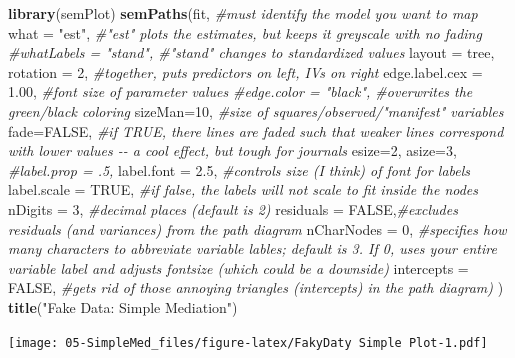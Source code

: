 \documentclass[
  11pt,
]{book}
\newenvironment{Shaded}{\begin{snugshade}}{\end{snugshade}}
\newcommand{\AttributeTok}[1]{\textcolor[rgb]{0.27,0.27,0.27}{#1}}
\newcommand{\CommentTok}[1]{\textcolor[rgb]{0.37,0.37,0.37}{\textit{#1}}}
\newcommand{\ConstantTok}[1]{\textcolor[rgb]{0.37,0.37,0.37}{#1}}
\newcommand{\DecValTok}[1]{\textcolor[rgb]{0.06,0.06,0.06}{#1}}
\newcommand{\FloatTok}[1]{\textcolor[rgb]{0.06,0.06,0.06}{#1}}
\newcommand{\FunctionTok}[1]{\textcolor[rgb]{0.27,0.27,0.27}{\textbf{#1}}}
\newcommand{\NormalTok}[1]{#1}
\newcommand{\StringTok}[1]{\textcolor[rgb]{0.5,0.5,0.5}{#1}}
\begin{document}
\begin{Shaded}
\begin{Highlighting}[]
\FunctionTok{library}\NormalTok{(semPlot)}
\FunctionTok{semPaths}\NormalTok{(fit, }\CommentTok{\#must identify the model you want to map}
         \AttributeTok{what =} \StringTok{"est"}\NormalTok{, }\CommentTok{\#"est" plots the estimates, but keeps it greyscale with no fading}
         \CommentTok{\#whatLabels = "stand", \#"stand" changes to standardized values}
         \AttributeTok{layout =} \StringTok{\textquotesingle{}tree\textquotesingle{}}\NormalTok{, }\AttributeTok{rotation =} \DecValTok{2}\NormalTok{, }\CommentTok{\#together, puts predictors on left, IVs on right }
         \AttributeTok{edge.label.cex =} \FloatTok{1.00}\NormalTok{, }\CommentTok{\#font size of parameter values}
         \CommentTok{\#edge.color = "black", \#overwrites the green/black coloring}
         \AttributeTok{sizeMan=}\DecValTok{10}\NormalTok{, }\CommentTok{\#size of squares/observed/"manifest" variables}
         \AttributeTok{fade=}\ConstantTok{FALSE}\NormalTok{, }\CommentTok{\#if TRUE, there lines are faded such that weaker lines correspond with lower values {-}{-} a cool effect, but tough for journals}
         \AttributeTok{esize=}\DecValTok{2}\NormalTok{, }
         \AttributeTok{asize=}\DecValTok{3}\NormalTok{,}
         \CommentTok{\#label.prop = .5,}
         \AttributeTok{label.font =} \FloatTok{2.5}\NormalTok{, }\CommentTok{\#controls size (I think) of font for labels}
         \AttributeTok{label.scale =} \ConstantTok{TRUE}\NormalTok{, }\CommentTok{\#if false, the labels will not scale to fit inside the nodes}
         \AttributeTok{nDigits =} \DecValTok{3}\NormalTok{, }\CommentTok{\#decimal places (default is 2)}
         \AttributeTok{residuals =} \ConstantTok{FALSE}\NormalTok{,}\CommentTok{\#excludes residuals (and variances) from the path diagram}
         \AttributeTok{nCharNodes =} \DecValTok{0}\NormalTok{, }\CommentTok{\#specifies how many characters to abbreviate variable lables; default is 3.  If 0, uses your entire variable label and adjusts fontsize (which could be a downside)}
         \AttributeTok{intercepts =} \ConstantTok{FALSE}\NormalTok{, }\CommentTok{\#gets rid of those annoying triangles (intercepts) in the path diagram)}
\NormalTok{)}
\FunctionTok{title}\NormalTok{(}\StringTok{"Fake Data:  Simple Mediation"}\NormalTok{)}
\end{Highlighting}
\end{Shaded}

\texttt{[image: 05-SimpleMed\_files/figure-latex/FakyDaty Simple Plot-1.pdf]}
\end{document}
